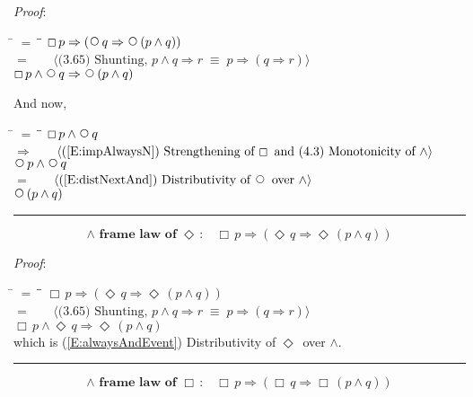 \documentclass[12pt, fleqn, leqno]{article}
\newcommand{\lgap}{2pt}                             %
\newcommand{\mymathindent}{24pt}                    %
\newcommand{\equivs}{\ensuremath{\;\equiv\;}}       %
\newcommand{\impl}{\ensuremath{\Rightarrow}}        %
\newcommand{\Next}{\;\,\text{\raisebox{3.5pt}{\circle{6}}}}
\newcommand{\Event}{\Diamond\,}
\newcommand{\Always}{\Box\,}
\newcommand{\myqed}{\rule[-.23ex]{1.2ex}{2.0ex}}
\newcommand{\myqedtab}{\hspace{384pt}}              %
\newcommand{\Gll} {\langle}                         %
\newcommand{\Ggg} {\rangle}                         %
\newcommand{\Hint}[1]     {\ \ \ $\Gll              \mbox{#1} \Ggg$ }   %
\begin{document}
\emph{Proof}:
\begin{tabbing}
\hspace{\mymathindent} \= $= \;$ \= \myqedtab \= \kill
  \> \>   $\Always p \impl (\Next q \impl \Next (p \land q))$\\[\lgap]
  \> $=$  \>  \Hint{(3.65) Shunting, $p\land q\impl r\equivs p\impl (q\impl r)$}\\[\lgap]
  \> \>   $\Always p \land \Next q \impl \Next (p \land q)$
\end{tabbing}
And now,
\begin{tabbing}
\hspace{\mymathindent} \= $= \;$ \= \myqedtab \= \kill
  \> \>   $\Always p \land \Next q $\\[\lgap]
  \> $\impl$  \>  \Hint{(\ref{E:impAlwaysN}) Strengthening of $\Always$ and (4.3) Monotonicity of $\land$}\\[\lgap]
  \> \>   $\Next p \land \Next q $\\[\lgap]
  \> $=$  \>  \Hint{(\ref{E:distNextAnd}) Distributivity of $\Next$ over $\land$}\\[\lgap]
  \> \>   $\Next (p \land q)$\quad \myqed
\end{tabbing}
\begin{equation}\label{E:framelawEvent}
\textbf{$\land$ frame law of $\Event$:}\quad \Always p \impl (\Event q \impl \Event (p \land q))
\end{equation}

\emph{Proof}:
\begin{tabbing}
\hspace{\mymathindent} \= $= \;$ \= \myqedtab \= \kill
  \> \>   $\Always p \impl (\Event q \impl \Event (p \land q))$\\[\lgap]
  \> $=$  \>  \Hint{(3.65) Shunting, $p\land q\impl r\equivs p\impl (q\impl r)$}\\[\lgap]
  \> \>   $\Always p \land \Event q \impl \Event (p \land q)$\\[\lgap]
  \> which is (\ref{E:alwaysAndEvent}) Distributivity of $\Event$ over $\land$. \quad \myqed
\end{tabbing}
\begin{equation}\label{E:framelawAlways}
\textbf{$\land$ frame law of $\Always$:}\quad \Always p \impl (\Always q \impl \Always (p \land q))
\end{equation}
\end{document}
